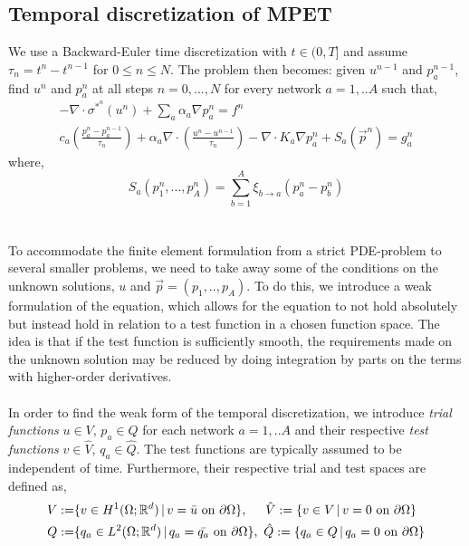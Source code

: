 \subsection{Temporal discretization of MPET}
We use a Backward-Euler time discretization with $t\in (0,T]$ and assume $\tau_n = t^n - t^{n-1}$ for $0 \leq n \leq N$. The problem then becomes: given $u^{n-1}$ and $p_a^{n-1}$, find $u^n$ and $p_a^n$ at all steps $n = 0, ..., N$ for every network $a=1,..A$ such that,
\begin{align} \label{temp_disc_mpet1}
- \nabla \cdot \sigma^{\ast^n}(u^n) + \displaystyle\sum_a \alpha_a \nabla p_a^n = f^n \\
c_a\left(\frac{p_a^n - p_a^{n-1}}{\tau_n} \right) + \alpha_a \nabla \cdot\left(\frac{u^n - u^{n-1}}{\tau_n}  \right) - \nabla \cdot K_a \nabla p_a^n + S_a(\vec{p}^n) = g_a^n \label{temp_disc_mpet2}
\end{align}
where,
\begin{equation} \label{S_a}
S_a(p_1^n, ..., p_A^n) = \displaystyle\sum_{b=1}^A \xi_{b \rightarrow a}(p^n_a - p^n_b)
\end{equation}
\\
\\
To accommodate the finite element formulation from a strict PDE-problem to several smaller problems, we need to take away some of the conditions on the unknown solutions, $u$ and $\vec{p} = (p_1,..,p_A)$. To do this, we introduce a weak formulation of the equation, which allows for the equation to not hold absolutely but instead hold in relation to a test function in a chosen function space. The idea is that if the test function is sufficiently smooth, the requirements made on the unknown solution may be reduced by doing integration by parts on the terms with higher-order derivatives. 
\\
\\
In order to find the weak form of the temporal discretization, we introduce \textit{trial functions} $u\in V$, $p_a \in Q$ for each network $a=1,..A$ and their respective \textit{test functions} $v \in \hat{V}$, $q_a \in \hat{Q}$. The test functions are typically assumed to be independent of time. Furthermore, their respective trial and test spaces are defined as,
\begin{align} 
V:= &\{v \in H^1(\Omega; \mathbb{R}^d) \, | \, v = \bar{u} \,\, \text{on} \, \, \partial \Omega\}, \hspace{0.5cm} 
\hat{V} :=  \{v \in V \, | \, v = 0 \,\, \text{on} \, \, \partial \Omega \} \\
Q:= &\{q_a \in L^2(\Omega; \mathbb{R}^d) \, | \, q_a = \bar{q_a} \,\, \text{on} \, \, \partial \Omega\}, \, \,
\hat{Q} := \{q_a \in Q \, | \, q_a = 0 \,\, \text{on} \, \, \partial \Omega\}
\end{align}
